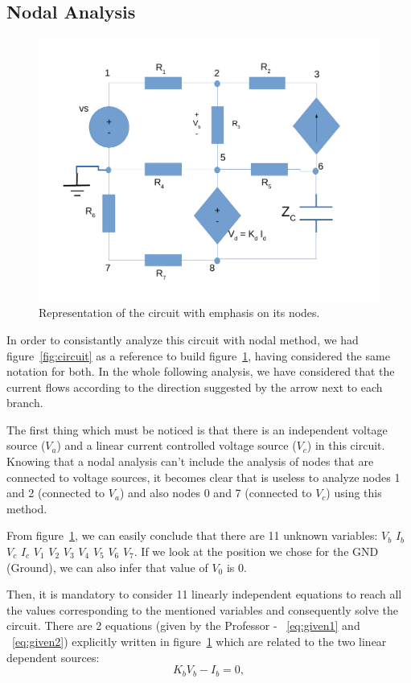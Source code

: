 \subsection{Nodal Analysis}
\label{sec:Nodal Analysis}

\begin{figure}[!ht] \centering
\includegraphics[width=0.8\linewidth]{circuit_node.pdf}
\caption{Representation of the circuit with emphasis on its nodes.}
\label{fig:nodescircuit}
\end{figure}

In order to consistantly analyze this circuit with nodal method, we had figure~\ref{fig:circuit} as a reference to build figure~\ref{fig:nodescircuit}, having considered the same notation for both. In the whole following analysis, we have considered that the current flows according to the direction suggested by the arrow next to each branch. 

The first thing which must be noticed is that there is an independent voltage source ($V_a$) and a linear current controlled voltage source ($V_c$) in this circuit. Knowing that a nodal analysis can't include the analysis of nodes that are connected to voltage sources, it becomes clear that is useless to analyze nodes 1 and 2 (connected to $V_a$) and also nodes 0 and 7 (connected to $V_c$) using this method.

From figure~\ref{fig:nodescircuit}, we can easily conclude that there are 11 unknown variables: $V_b$ $I_b$ $V_c$ $I_c$ $V_1$ $V_2$ $V_3$ $V_4$ $V_5$ $V_6$ $V_7$. If we look at the position we chose for the GND (Ground), we can also infer that value of $V_0$ is 0.

Then, it is mandatory to consider 11 linearly independent equations to reach all the values corresponding to the mentioned variables and consequently solve the circuit. There are 2 equations (given by the Professor - ~\ref{eq:given1} and ~\ref{eq:given2}) explicitly written in figure~\ref{fig:nodescircuit} which are related to the two linear dependent sources:
\begin{equation}
  K_{b}V_{b} - I_{b} = 0,
  \label{eq:given1}
\end{equation}

